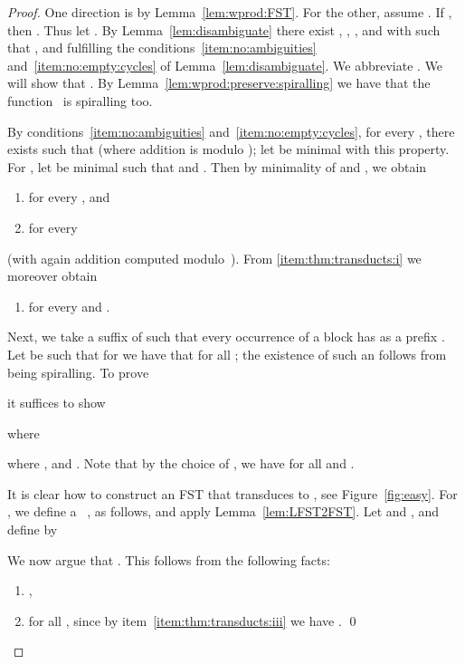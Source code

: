 \begin{proof}
  One direction is by Lemma~\ref{lem:wprod:FST}.
  For the other, assume .
  If , then .
  Thus let .
  By Lemma~\ref{lem:disambiguate} there exist
  , , ,  and  
  with 
  such that , and
  fulfilling the conditions~\ref{item:no:ambiguities} and~\ref{item:no:empty:cycles} 
  of Lemma~\ref{lem:disambiguate}.
  We abbreviate .
  We will show that .
By Lemma~\ref{lem:wprod:preserve:spiralling}
  we have that the function~ is spiralling too.
  
By conditions~\ref{item:no:ambiguities} and~\ref{item:no:empty:cycles},
  for every ,
  there exists  such that  
  (where addition is modulo );
  let  be minimal with this property.
For , let  be minimal such that 
  and .
  Then by minimality of  and , we obtain
  \begin{enumerate}
    \item \label{item:thm:transducts:i}
       for every , and
    \item 
       for every 
  \end{enumerate}
  (with again addition computed modulo~).
  From \ref{item:thm:transducts:i} we moreover obtain
  \begin{enumerate}[resume]
    \item \label{item:thm:transducts:iii}
       for every  and .
  \end{enumerate}

  Next, we take a suffix  of  such that every occurrence of a block 
  has as a prefix .
  Let  be such that for 
  we have that  for all ;
  the existence of such an  follows from  being spiralling.
  To prove
  
  it suffices to show
  
  where
  
  where , and .
  Note that by the choice of , we have
   for all  and .

  It is clear how to construct an FST that transduces  to ,
  see Figure~\ref{fig:easy}.
  For , we define a \lfst~, as follows,
  and apply Lemma~\ref{lem:LFST2FST}.
  Let  and ,
  and define  by
  
  We now argue that .
  This follows from the following facts:
  \begin{enumerate}[label=(\alph*)]
    \item ,
    \item 
      for all , since by item~\ref{item:thm:transducts:iii} 
      we have .
      \qed
  \end{enumerate}
\end{proof}

